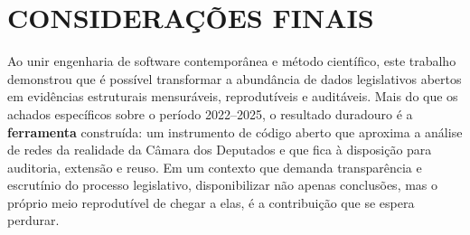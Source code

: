 \documentclass[
      12pt,
      a4paper,
      openright,
      oneside,
      chapter=TITLE,
      section=TITLE,
      english,
      french,
      spanish,
      brazilian
    ]{abntex2}
\begin{document}
    \section{CONSIDERAÇÕES FINAIS}
    
    Ao unir engenharia de software contemporânea e método científico, este trabalho demonstrou que é possível transformar a abundância de dados legislativos abertos em evidências estruturais mensuráveis, reprodutíveis e auditáveis. Mais do que os achados específicos sobre o período 2022--2025, o resultado duradouro é a \textbf{ferramenta} construída: um instrumento de código aberto que aproxima a análise de redes da realidade da Câmara dos Deputados e que fica à disposição para auditoria, extensão e reuso. Em um contexto que demanda transparência e escrutínio do processo legislativo, disponibilizar não apenas conclusões, mas o próprio meio reprodutível de chegar a elas, é a contribuição que se espera perdurar.
    
        \postextual
    
        
    
\end{document}
